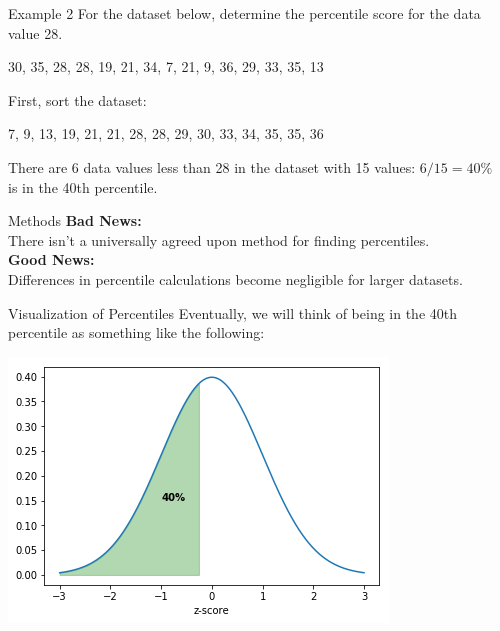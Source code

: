 \documentclass[t]{beamer}
\begin{document}
\begin{frame}{Example 2}
For the dataset below, determine the percentile score for the data value 28.
\begin{center}
30, 35, 28, 28, 19, 21, 34, 7, 21, 9, 36, 29, 33, 35, 13
\end{center}
\vspace{8pt}	\pause
First, sort the dataset:
\begin{center}
7, 9, 13, 19, 21, 21, 28, 28, 29, 30, 33, 34, 35, 35, 36
\end{center}
\vspace{8pt}	\pause
There are 6 data values less than 28 in the dataset with 15 values: \quad $6/15 = 40\%$	\newline\\	 is in the 40th percentile.
\end{frame}

\begin{frame}{Methods}
\textbf{Bad News:}	\newline\\
There isn't a universally agreed upon method for finding percentiles.	\newline\\	\pause
\textbf{Good News:}	\newline\\	
Differences in percentile calculations become negligible for larger datasets.
\end{frame}

\begin{frame}{Visualization of Percentiles}
Eventually, we will think of being in the 40th percentile as something like the following:	
\begin{center}
\includegraphics[scale=0.6]{../Images/percentile.png}
\end{center}
\end{frame}
\end{document}
